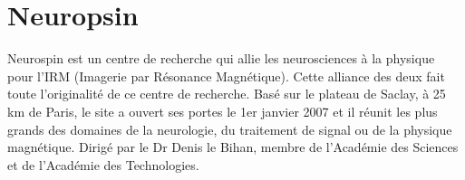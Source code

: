 \section{Neuropsin}

Neurospin est un centre de recherche qui allie les neurosciences à la physique pour l'IRM (Imagerie par Résonance Magnétique). 
Cette alliance des deux fait toute l'originalité de ce centre de recherche.
Basé sur le plateau de Saclay, à 25 km de Paris, le site a ouvert ses portes le 1er janvier 2007 et il réunit les plus grands des domaines de la neurologie, du traitement de signal ou de la physique magnétique.
Dirigé par le Dr Denis le Bihan, membre de l’Académie des Sciences et de l'Académie des Technologies.

